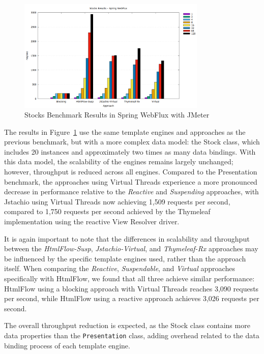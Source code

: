 \begin{figure}[h]
     \centering
     \includegraphics[width=0.8\textwidth]{./Graphs/stocks-webflux-jmeter.png}
     \caption{Stocks Benchmark Results in Spring WebFlux with JMeter}\label{fig:stocks-webflux-jmeter}
\end{figure}

The results in Figure~\ref{fig:stocks-webflux-jmeter} use the same template
engines and approaches as the previous benchmark, but with a more complex data
model: the Stock class, which includes 20 instances and approximately two
times as many data bindings. With this data model, the scalability of the
engines remains largely unchanged; however, throughput is reduced across all
engines. Compared to the Presentation benchmark, the approaches using Virtual
Threads experience a more pronounced decrease in performance relative to the
\textit{Reactive} and \textit{Suspending} approaches, with Jstachio using
Virtual Threads now achieving 1,509 requests per second, compared to 1,750
requests per second achieved by the Thymeleaf implementation using the reactive
View Resolver driver.

It is again important to note that the differences in scalability and
throughput between the \textit{HtmlFlow-Susp}, \textit{Jstachio-Virtual}, and
\textit{Thymeleaf-Rx} approaches may be influenced by the specific template
engines used, rather than the approach itself. When comparing the
\textit{Reactive}, \textit{Suspendable}, and \textit{Virtual} approaches
specifically with HtmlFlow, we found that all three achieve similar
performance: HtmlFlow using a blocking approach with Virtual Threads reaches
3,090 requests per second, while HtmlFlow using a reactive approach achieves
3,026 requests per second.

The overall throughput reduction is expected, as the Stock class contains more
data properties than the \texttt{Presentation} class, adding overhead related
to the data binding process of each template engine.

